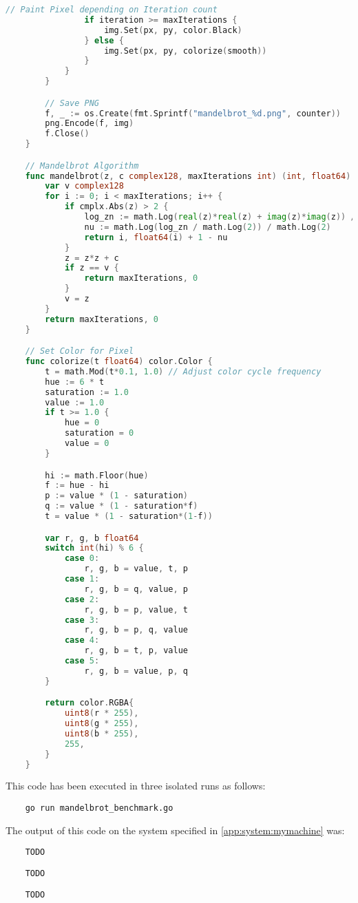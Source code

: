 \begin{lstlisting}[language=go, frame=tb, caption={Mandelbrot Set Calculation}]
                // Paint Pixel depending on Iteration count
                if iteration >= maxIterations {
                    img.Set(px, py, color.Black)
                } else {
                    img.Set(px, py, colorize(smooth))
                }
            }
        }

        // Save PNG
        f, _ := os.Create(fmt.Sprintf("mandelbrot_%d.png", counter))
        png.Encode(f, img)
        f.Close()
    }

    // Mandelbrot Algorithm
    func mandelbrot(z, c complex128, maxIterations int) (int, float64) {
        var v complex128
        for i := 0; i < maxIterations; i++ {
            if cmplx.Abs(z) > 2 {
                log_zn := math.Log(real(z)*real(z) + imag(z)*imag(z)) / 2
                nu := math.Log(log_zn / math.Log(2)) / math.Log(2)
                return i, float64(i) + 1 - nu
            }
            z = z*z + c
            if z == v {
                return maxIterations, 0
            }
            v = z
        }
        return maxIterations, 0
    }

    // Set Color for Pixel
    func colorize(t float64) color.Color {
        t = math.Mod(t*0.1, 1.0) // Adjust color cycle frequency
        hue := 6 * t
        saturation := 1.0
        value := 1.0
        if t >= 1.0 {
            hue = 0
            saturation = 0
            value = 0
        }

        hi := math.Floor(hue)
        f := hue - hi
        p := value * (1 - saturation)
        q := value * (1 - saturation*f)
        t = value * (1 - saturation*(1-f))

        var r, g, b float64
        switch int(hi) % 6 {
            case 0:
                r, g, b = value, t, p
            case 1:
                r, g, b = q, value, p
            case 2:
                r, g, b = p, value, t
            case 3:
                r, g, b = p, q, value
            case 4:
                r, g, b = t, p, value
            case 5:
                r, g, b = value, p, q
        }

        return color.RGBA{
            uint8(r * 255),
            uint8(g * 255),
            uint8(b * 255),
            255,
        }
    }    
\end{lstlisting}

This code has been executed in three isolated runs as follows:
\begin{lstlisting}
    go run mandelbrot_benchmark.go
\end{lstlisting}

The output of this code on the system specified in \ref{app:system:mymachine} was:
\begin{lstlisting}
    TODO
\end{lstlisting}
\begin{lstlisting}
    TODO
\end{lstlisting}
\begin{lstlisting}
    TODO
\end{lstlisting}